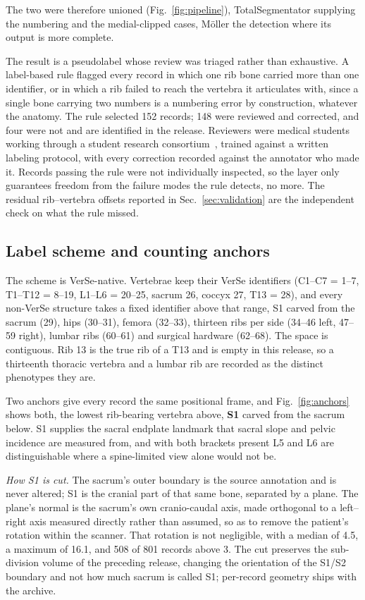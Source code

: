 \documentclass[aapm,mph,amsmath,amssymb,reprint]{revtex4-2}
\newif\ifreview \reviewtrue
\newcommand{\consortium}{\ifreview a student research consortium\else OpenSpineConsortium\fi}
\begin{document}
The two were therefore unioned (Fig.~\ref{fig:pipeline}), TotalSegmentator supplying the
numbering and the medial-clipped cases, Möller the detection where its output is more
complete.

The result is a pseudolabel whose review was triaged rather than exhaustive. A label-based
rule flagged every record in which one rib
bone carried more than one identifier, or in which a rib failed to reach the vertebra it
articulates with, since a single bone carrying two numbers is a numbering error by construction,
whatever the anatomy. The rule selected 152 records; 148 were reviewed and corrected, and four
were not and are identified in the release. Reviewers were medical students working through
\consortium~\cite{osc2026}, trained against a written labeling protocol, with every
correction recorded against the annotator who made it. Records passing the rule were not
individually inspected, so the layer only guarantees freedom from the failure modes the rule detects, no more. The residual rib--vertebra offsets reported in
Sec.~\ref{sec:validation} are the independent check on what the rule missed.

\subsection{Label scheme and counting anchors}\label{sec:anchors}

The scheme is VerSe-native. Vertebrae keep their VerSe identifiers (C1--C7 = 1--7,
T1--T12 = 8--19, L1--L6 = 20--25, sacrum 26, coccyx 27, T13 = 28), and every non-VerSe
structure takes a fixed identifier above that range, S1 carved from the sacrum (29), hips (30--31), femora (32--33), thirteen ribs per side (34--46 left, 47--59 right), lumbar ribs (60--61) and surgical hardware (62--68). The space is contiguous. Rib 13 is the true rib of a T13 and is empty in this release, so a thirteenth thoracic vertebra and a lumbar rib are recorded as the distinct phenotypes they are.

Two anchors give every record the same positional frame, and Fig.~\ref{fig:anchors} shows both, the lowest rib-bearing vertebra above, \textbf{S1} carved from the sacrum below.  S1 supplies the sacral endplate
landmark that sacral slope and pelvic incidence are measured from, and with both brackets
present L5 and L6 are distinguishable where a spine-limited view alone would not be.

\emph{How S1 is cut.} The sacrum's outer boundary is the source annotation and is never
altered; S1 is the cranial part of that same bone, separated by a plane. The plane's normal
is the sacrum's own cranio-caudal axis, made orthogonal to a left--right axis
measured directly rather than assumed, so as to remove the patient's rotation within the scanner. That rotation is not negligible, with a median of 4.5\textdegree{}, a maximum of 16.1\textdegree{}, and 508 of 801 records above
3\textdegree{}. The cut preserves the sub-division volume of the preceding release,
changing the orientation of the S1/S2 boundary and not how much sacrum is called S1;
per-record geometry ships with the archive.
\end{document}
